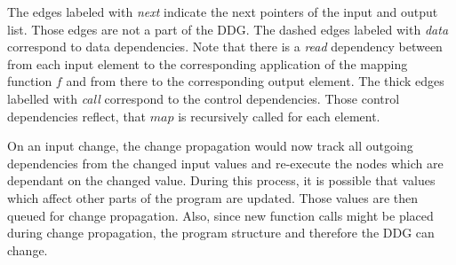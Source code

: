 The edges labeled with \textit{next} indicate the next pointers of the input and output list. Those edges are not a part of the DDG. The dashed edges labeled with \textit{data} correspond to data dependencies. Note that there is a \textit{read} dependency between from each input element to the corresponding application of the mapping function $f$ and from there to the corresponding output element. The thick edges labelled with \textit{call} correspond to the control dependencies. Those control dependencies reflect, that $map$ is recursively called for each element. 

On an input change, the change propagation would now track all outgoing dependencies from the changed input values and re-execute the nodes which are dependant on the changed value. During this process, it is possible that values which affect other parts of the program are updated. Those values are then queued for change propagation. Also, since new function calls might be placed during change propagation, the program structure and therefore the DDG can change.  


